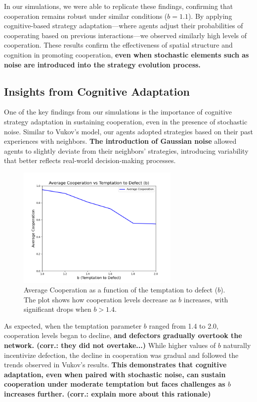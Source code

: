 \documentclass[runningheads]{llncs}
\begin{document}
In our simulations, we were able to replicate these findings, confirming that cooperation remains robust under similar conditions (\( b = 1.1 \)). By applying cognitive-based strategy adaptation—where agents adjust their probabilities of cooperating based on previous interactions—we observed similarly high levels of cooperation. These results confirm the effectiveness of spatial structure and cognition in promoting cooperation, \textbf{even when stochastic elements such as noise are introduced into the strategy evolution process.}

\subsection{Insights from Cognitive Adaptation}
One of the key findings from our simulations is the importance of cognitive strategy adaptation in sustaining cooperation, even in the presence of stochastic noise. Similar to Vukov's model, our agents adopted strategies based on their past experiences with neighbors. \textbf{The introduction of Gaussian noise} allowed agents to slightly deviate from their neighbors' strategies, introducing variability that better reflects real-world decision-making processes.

\begin{figure}[htbp]
    \centering
    \includegraphics[width=0.7\textwidth]{cooperation_vs_b.png}
    \caption{Average Cooperation as a function of the temptation to defect (\( b \)). The plot shows how cooperation levels decrease as \( b \) increases, with significant drops when \( b > 1.4 \).}
    \label{fig:coop_vs_b}
\end{figure}

As expected, when the temptation parameter \( b \) ranged from 1.4 to 2.0, cooperation levels began to decline, \textbf{and defectors gradually overtook the network. (corr.: they did not overtake...)} While higher values of \( b \) naturally incentivize defection, the decline in cooperation was gradual and followed the trends observed in Vukov's results. \textbf{This demonstrates that cognitive adaptation, even when paired with stochastic noise, can sustain cooperation under moderate temptation but faces challenges as \( b \) increases further. (corr.: explain more about this rationale)}
\end{document}
